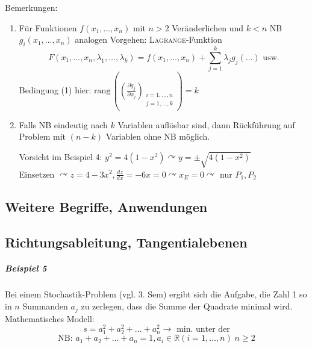 \documentclass[a4paper]{scrartcl}
\begin{document}
\begin{enumerate}
\begin{enumerate}
Bemerkungen:
\begin{enumerate}
\item Für Funktionen $f(x_1,\dots,x_n)$ mit $n>2$ Veränderlichen und $k<n$ NB $g_i(x_1,\dots,x_n)$ analogen Vorgehen: \textsc{Lagrange}-Funktion
\[F(x_1,\dots,x_n, \lambda_1,\dots,\lambda_k) = f (x_1,\dots,x_n) + \sum\limits_{j=1}^k \lambda_j g_j (\dots) \text{ usw.} \]
Bedingung (1) hier: $\text{rang} \, \left ( (\frac{\partial g_j}{\partial x_j} )_{\begin{array}{c}i=1,\dots,n\\ j = 1, \dots ,k\\ \end{array}} \right ) = k$
\item Falls NB eindeutig nach $k$ Variablen auflösbar sind, dann Rückführung auf Problem mit $(n-k)$ Variablen ohne NB möglich.

Vorsicht im Beispiel 4: $y^2 = 4(1-x^2) \curvearrowright  y =\pm \sqrt{4(1-x^2)}$\\
Einsetzen $\curvearrowright z = 4-3x^2, \frac{dz}{dx} = -6x = 0 \curvearrowright x_E = 0 \curvearrowright$ nur $P_1,P_2$
\end{enumerate}



\end{enumerate}


\end{enumerate}

\subsection{Weitere Begriffe, Anwendungen}
\subsection{Richtungsableitung, Tangentialebenen}

\subparagraph{Beispiel 5} Bei einem Stochastik-Problem (vgl. 3. Sem) ergibt sich die Aufgabe, die Zahl 1 so in $n$ Summanden $a_j$ zu zerlegen, dass die Summe der Quadrate minimal wird.\\
Mathematisches Modell:
\[ s= a_1^2 + a_2^2 + \dots + a_n^2 \rightarrow \text{ min. unter der} \]
\[\text{NB: } a_1+a_2 + \dots + a_n = 1, a_i \in \mathbb{R} (i=1,\dots,n) \; n \geq 2 \]
\end{document}

